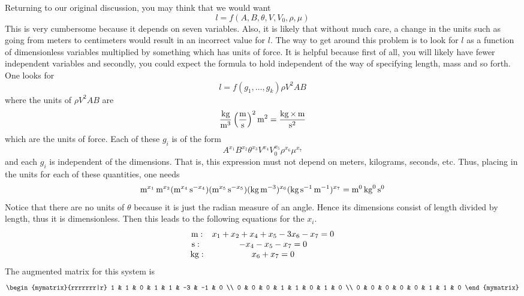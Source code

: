 Returning to our original discussion, you may think that we would want
\begin{equation*}
  l=f(A,B,\theta,V,V_0,\rho,\mu)
\end{equation*}
This is very cumbersome because it depends on seven variables. Also,
it is likely that without much care, a change in the units such as
going from meters to centimeters would result in an incorrect value
for $l$. The way to get around this problem is to look for $l$ as a
function of dimensionless variables multiplied by something which has
units of force. It is helpful because first of all, you will likely
have fewer independent variables and secondly, you could expect the
formula to hold independent of the way of specifying length, mass and
so forth. One looks for
\begin{equation*}
  l=f(g_1,\ldots,g_k) \rho V^2AB
\end{equation*}
where the units of $\rho V^2AB$ are
\begin{equation*}
  \frac{\mathop{\textrm{\rm kg}}\nolimits}{\mathop{\textrm{\rm m}}\nolimits^3}\left(\frac{\mathop{\textrm{\rm m}}\nolimits}{\mathop{\textrm{\rm s}}\nolimits}\right)^2\mathop{\textrm{\rm m}}\nolimits^2=\frac{\mathop{\textrm{\rm kg}}\nolimits\times \mathop{\textrm{\rm m}}\nolimits}{\mathop{\textrm{\rm s}}\nolimits^2}
\end{equation*}
which are the units of force. Each of these $g_i$ is of the form
\begin{equation}
  A^{x_1}B^{x_2}\theta^{x_3}V^{x_4}V_0^{x_5}\rho^{x_6}\mu
  ^{x_7}  \label{11-july-e1f}
\end{equation}
and each $g_i$ is independent of the dimensions. That is, this
expression must not depend on meters, kilograms, seconds, etc. Thus,
placing in the units for each of these quantities, one needs
\begin{equation*}
  \mathop{\textrm{\rm m}}\nolimits^{x_1}\mathop{\textrm{\rm m}}\nolimits^{x_2}(\mathop{\textrm{\rm m}}\nolimits^{x_4}\mathop{\textrm{\rm s}}\nolimits^{-x_4}) (\mathop{\textrm{\rm m}}\nolimits^{x_5}\mathop{\textrm{\rm s}}\nolimits
  ^{-x_5}) (\mathop{\textrm{\rm kg}}\nolimits\mathop{\textrm{\rm m}}\nolimits^{-3})^{x_6}(\mathop{\textrm{\rm kg}}\nolimits\mathop{\textrm{\rm s}}\nolimits
  ^{-1}\mathop{\textrm{\rm m}}\nolimits^{-1})^{x_7}=\mathop{\textrm{\rm m}}\nolimits^0\mathop{\textrm{\rm kg}}\nolimits^0\mathop{\textrm{\rm s}}\nolimits^0
\end{equation*}
Notice that there are no units of $\theta$ because it is just the
radian measure of an angle. Hence its dimensions consist of length
divided by length, thus it is dimensionless. Then this leads to the
following equations for the $x_i$.
\begin{equation*}
  \begin{array}{cc}
    \mathop{\textrm{\rm m}}\nolimits: & x_1+x_2+x_4+x_5-3x_6-x_7=0 \\
    \mathop{\textrm{\rm s}}\nolimits :\  & -x_4-x_5-x_7=0 \\
    \mathop{\textrm{\rm kg}}\nolimits: & x_6+x_7=0
  \end{array}
\end{equation*}
The augmented matrix for this system is
\begin{equation*}
  \begin{mymatrix}{rrrrrrr|r}
    1 & 1 & 0 & 1 & 1 & -3 & -1 & 0 \\
    0 & 0 & 0 & 1 & 1 & 0 & 1 & 0 \\
    0 & 0 & 0 & 0 & 0 & 1 & 1 & 0
  \end{mymatrix}
\end{equation*}
